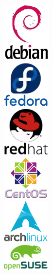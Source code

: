 \documentclass{beamer}
\begin{document}
\begin{frame}
\begin{columns}
\begin{column}{4cm}
\begin{figure}
\includegraphics[scale=0.2]{debian.png}\\
\includegraphics[scale=0.2]{fedora.png}\\%
\includegraphics[scale=0.2]{redhat.png}\\%
\includegraphics[scale=0.2]{centos.png}\\
\includegraphics[scale=0.2]{arch.png}\\%
\includegraphics[scale=0.2]{suse.png}
\end{figure}
\end{column}
\end{columns}
\end{frame}
\end{document}

